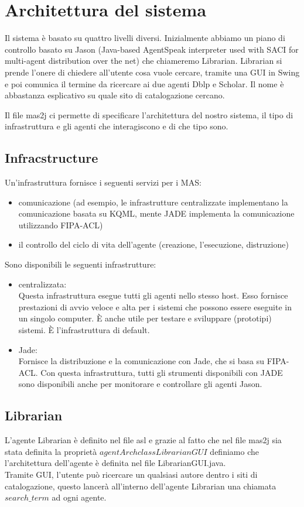 \documentclass[12pt]{article}
\begin{document}
\section{Architettura del sistema}
Il sistema \`e basato su quattro livelli diversi. Inizialmente abbiamo un piano di controllo basato su Jason (Java-based AgentSpeak interpreter used with SACI for multi-agent distribution over the net) che chiameremo Librarian. Librarian si prende l'onere di chiedere all'utente cosa vuole cercare, tramite una GUI in Swing e poi comunica il termine da ricercare ai due agenti Dblp e Scholar. Il nome \`e abbastanza esplicativo su quale sito di catalogazione cercano.

Il file mas2j ci permette di specificare l'architettura del nostro sistema, il tipo di infrastruttura e gli agenti che interagiscono e di che tipo sono.
\\
\subsection{Infracstructure}
Un'infrastruttura fornisce i seguenti servizi per i MAS:
\begin{itemize}
\item comunicazione (ad esempio, le infrastrutture centralizzate implementano la comunicazione basata su KQML, mente JADE implementa la comunicazione utilizzando FIPA-ACL)
\item il controllo del ciclo di vita dell'agente (creazione, l'esecuzione, distruzione)
\end{itemize}
Sono disponibili le seguenti infrastrutture:
\begin{itemize}
\item  centralizzata: \\ Questa infrastruttura esegue tutti gli agenti nello stesso host. Esso fornisce prestazioni di avvio veloce e alta per i sistemi che possono essere eseguite in un singolo computer. \`E  anche utile per testare e sviluppare (prototipi) sistemi. \`E l'infrastruttura di default.
\item Jade: \\ Fornisce la distribuzione e la comunicazione con Jade, che si basa su FIPA-ACL. Con questa infrastruttura, tutti gli strumenti disponibili con JADE sono disponibili anche per monitorare e controllare gli agenti Jason.
\end{itemize}
\subsection{Librarian}


L'agente Librarian \`e definito nel file asl e grazie al fatto che nel file mas2j sia stata definita la propriet\`a $agentArchclass LibrarianGUI$ definiamo che l'architettura dell'agente \`e definita nel file LibrarianGUI.java. \\
Tramite GUI, l'utente pu\`o ricercare un qualsiasi autore dentro i siti di catalogazione, questo lancer\`a all'interno dell'agente Librarian una chiamata $search\_term$ ad ogni agente. \\
\end{document}
